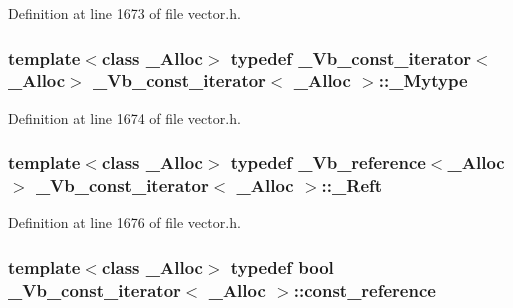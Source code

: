 Definition at line 1673 of file vector.\+h.

\hypertarget{class___vb__const__iterator_acab47f643a88497fc0bb9c74afc59fde}{
\subsubsection[{\+\_\+\+Mytype}]{\setlength{\rightskip}{0pt plus 5cm}template$<$class \+\_\+\+Alloc$>$ typedef {\bf \+\_\+\+Vb\+\_\+const\+\_\+iterator}$<$\+\_\+\+Alloc$>$ {\bf \+\_\+\+Vb\+\_\+const\+\_\+iterator}$<$ \+\_\+\+Alloc $>$\+::{\bf \+\_\+\+Mytype}}}\label{class___vb__const__iterator_acab47f643a88497fc0bb9c74afc59fde}


Definition at line 1674 of file vector.\+h.

\hypertarget{class___vb__const__iterator_a9955dddb0c1346eacd54df1c2cc6e628}{
\subsubsection[{\+\_\+\+Reft}]{\setlength{\rightskip}{0pt plus 5cm}template$<$class \+\_\+\+Alloc$>$ typedef {\bf \+\_\+\+Vb\+\_\+reference}$<$\+\_\+\+Alloc$>$ {\bf \+\_\+\+Vb\+\_\+const\+\_\+iterator}$<$ \+\_\+\+Alloc $>$\+::{\bf \+\_\+\+Reft}}}\label{class___vb__const__iterator_a9955dddb0c1346eacd54df1c2cc6e628}


Definition at line 1676 of file vector.\+h.

\hypertarget{class___vb__const__iterator_a7115c71f1b57c74be5291ce71b94b101}{
\subsubsection[{const\+\_\+reference}]{\setlength{\rightskip}{0pt plus 5cm}template$<$class \+\_\+\+Alloc$>$ typedef bool {\bf \+\_\+\+Vb\+\_\+const\+\_\+iterator}$<$ \+\_\+\+Alloc $>$\+::{\bf const\+\_\+reference}}}\label{class___vb__const__iterator_a7115c71f1b57c74be5291ce71b94b101}


